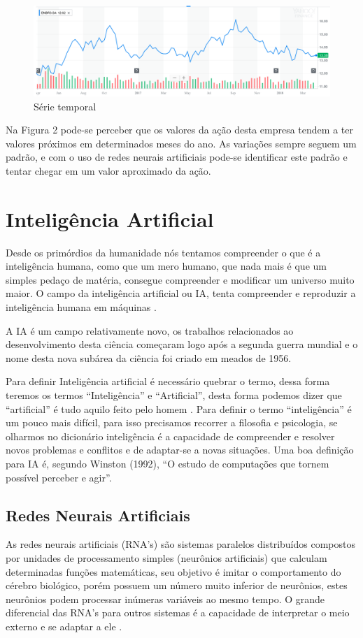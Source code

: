 \begin{figure}[htb]
 \centering
 	\caption{Série temporal}
 	\label{fig:Série temporal}
 	\includegraphics[scale=0.5]{figuras/serie-temporal-yahoo.png}
 \end{figure}

Na Figura 2 pode-se perceber que os valores da ação desta empresa tendem a ter valores próximos em determinados meses do ano. As variações sempre seguem um padrão, e com o uso de redes neurais artificiais pode-se identificar este padrão e tentar chegar em um valor aproximado da ação.

\section{Inteligência Artificial}
Desde os primórdios da humanidade nós tentamos compreender o que é a inteligência humana, como que um mero humano, que nada mais é que um simples pedaço de matéria, consegue compreender e modificar um universo muito maior. O campo da inteligência artificial ou IA, tenta compreender e reproduzir a inteligência humana em máquinas \cite{RUSSUEL}. 

A IA é um campo relativamente novo, os trabalhos relacionados ao desenvolvimento desta ciência começaram logo após a segunda guerra mundial e o nome desta nova subárea da ciência foi criado em meados de 1956.

Para definir Inteligência artificial é necessário quebrar o termo, dessa forma teremos os termos “Inteligência” e “Artificial”, desta forma podemos dizer que “artificial” é tudo aquilo feito pelo homem \cite{ROSA}. Para definir o termo “inteligência” é um pouco mais difícil, para isso precisamos recorrer a filosofia e psicologia, se olharmos no dicionário inteligência é a capacidade de compreender e resolver novos problemas e conflitos e de adaptar-se a novas situações. Uma boa definição para IA é, segundo Winston (1992), “O estudo de computações que tornem possível perceber e agir”.

\subsection{Redes Neurais Artificiais}
As redes neurais artificiais (RNA’s) são sistemas paralelos distribuídos compostos por unidades de processamento simples (neurônios artificiais) que calculam determinadas funções matemáticas, seu objetivo é imitar o comportamento do cérebro biológico, porém possuem um número muito inferior de neurônios, estes neurônios podem processar inúmeras variáveis ao mesmo tempo. O grande diferencial das RNA’s para outros sistemas é a capacidade de interpretar o meio externo e se adaptar a ele \cite{FINOCCHIO} \cite{BRAGA}.

